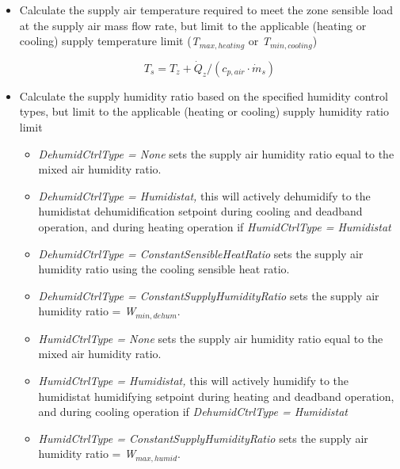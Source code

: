 \begin{itemize}
\begin{itemize}
        Otherwise the entering air conditions are set equal to the outside air conditions.
    \end{itemize}

  \item Calculate the supply air temperature required to meet the zone sensible load at the supply air mass flow rate, but limit to the applicable (heating or cooling) supply temperature limit (\emph{T\(_{max,heating}\)} or \emph{T\(_{min,cooling}\)})

    \begin{equation}
      {T_s} = {T_z} + {\dot Q_z}/({c_{p,air}}\cdot {\dot m_s})
    \end{equation}

  \item Calculate the supply humidity ratio based on the specified humidity control types, but limit to the applicable (heating or cooling) supply humidity ratio limit

    \begin{itemize}
      \item \emph{DehumidCtrlType = None} sets the supply air humidity ratio equal to the mixed air humidity ratio.
      \item \emph{DehumidCtrlType = Humidistat,} this will actively dehumidify to the humidistat dehumidification setpoint during cooling and deadband operation, and during heating operation if \emph{HumidCtrlType = Humidistat}
      \item \emph{DehumidCtrlType = ConstantSensibleHeatRatio} sets the supply air humidity ratio using the cooling sensible heat ratio.
      \item \emph{DehumidCtrlType = ConstantSupplyHumidityRatio} sets the supply air humidity ratio = \emph{W\(_{min,dehum}\)}.
      \item \emph{HumidCtrlType = None} sets the supply air humidity ratio equal to the mixed air humidity ratio.
      \item \emph{HumidCtrlType = Humidistat,} this will actively humidify to the humidistat humidifying setpoint during heating and deadband operation, and during cooling operation if \emph{DehumidCtrlType = Humidistat}
      \item \emph{HumidCtrlType = ConstantSupplyHumidityRatio} sets the supply air humidity ratio = \emph{W\(_{max,humid}\)}.
    \end{itemize}


\end{itemize}
